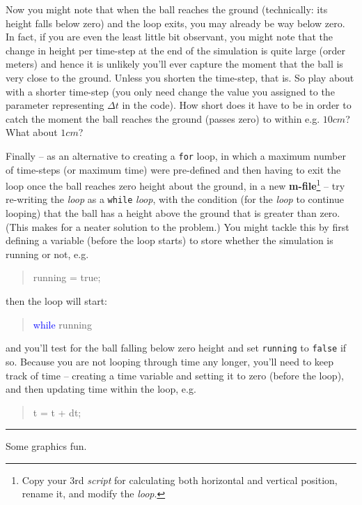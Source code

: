 \documentclass{tufte-book} %
\newenvironment{docspec}{\begin{quotation}\ttfamily\parskip0pt\parindent0pt\ignorespaces}{\end{quotation}}
\begin{document}
Now you might note that when the ball reaches the ground (technically: its height falls below zero) and the loop exits, you may already be way below zero. In fact, if you are even the least little bit observant, you might note that the change in height per time-step at the end of the simulation is quite large (order meters) and hence it is unlikely you'll ever capture the moment that the ball is very close to the ground. Unless you shorten the time-step, that is. So play about with a shorter time-step (you only need change the value you assigned to the parameter representing \(\Delta t\) in the code). How short does it have to be in order to catch the moment the ball reaches the ground (passes zero) to within e.g. \(10 cm\)? What about \(1 cm\)?

Finally -- as an alternative to creating a \texttt{for} loop, in which  a maximum number of time-steps (or maximum time)  were pre-defined and then  having to exit the loop once the ball reaches zero height about the ground, in a new \textbf{m-file}\footnote{Copy your 3rd \textit{script} for calculating both horizontal and vertical position, rename it, and modify the \textit{loop}.} -- try re-writing the \textit{loop} as a \texttt{while} \textit{loop}, with the condition (for the \textit{loop} to continue looping) that the ball has a height above the ground that is greater than zero. (This makes for a neater solution to the problem.) You might tackle this by first defining a variable (before the loop starts) to store whether the simulation is running or not, e.g.
\begin{docspec}
running = true;
\end{docspec}
then the loop will start:
\begin{docspec}
\textcolor{blue}{while} running
\end{docspec}
and you'll test for the ball falling below zero height and set \texttt{running} to \texttt{false} if so. Because you are not looping through time any longer, you'll need to keep track of time -- creating a time variable and setting it to zero (before the loop), and then updating time within the loop, e.g.
\begin{docspec}
t = t + dt;
\end{docspec}

\vspace{1mm}
\noindent\rule{4cm}{0.5pt}
\vspace{-2mm}

 Some graphics fun.
\end{document}
